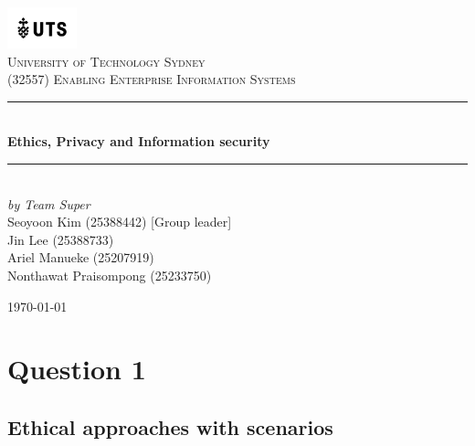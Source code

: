 \documentclass[12pt,a4paper]{article}
\begin{document}

\begin{titlepage}

\newcommand{\HRule}{\rule{\linewidth}{0.5mm}}
\center

\vspace*{1\baselineskip}
\includegraphics[width=0.15\textwidth]{images/UTS.png}\\
\textsc{\LARGE University of Technology Sydney}\\[2.0cm]
\textsc{\Large (32557) Enabling Enterprise Information Systems}\\[0.2cm]

\HRule\\[0.6cm]
{\huge\bfseries Ethics, Privacy and Information security}\\[0.4cm]
\HRule\\[10cm]

\emph{by Team Super} \\
{ Seoyoon Kim (25388442) [Group leader] \\}
{ Jin Lee (25388733)  \\}
{ Ariel Manueke (25207919) \\}
{ Nonthawat Praisompong (25233750) \\}

\vfill
{\large\today}

\vfill

\end{titlepage}


\tableofcontents
\thispagestyle{nofooter}
\cleardoublepage

\pagebreak





\setcounter{page}{1}

\section{Question 1}
\subsection{Ethical approaches with scenarios}
\label{sec:Question 1}
\nocite{question_1.2}
\end{document}
